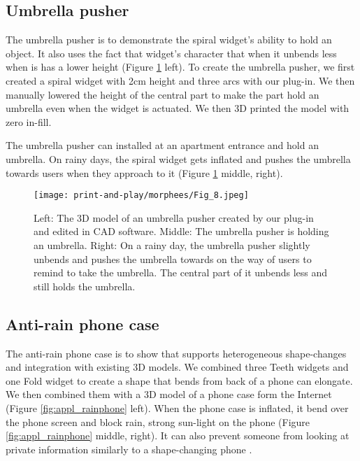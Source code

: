     \subsection{Umbrella pusher}
      The umbrella pusher is to demonstrate the spiral widget's ability to hold
      an object.  It also uses the fact that widget's character that when it
      unbends less when is has a lower height (Figure \ref{fig:appl_umbrella}
      left). To create the umbrella pusher, we first created a spiral widget
      with 2cm height and three arcs with our plug-in. We then manually lowered
      the height of the central part to make the part hold an umbrella even when
      the widget is actuated. We then 3D printed the model with zero in-fill.
    
      The umbrella pusher can installed at an apartment entrance and hold an
      umbrella.  On rainy days, the spiral widget gets inflated and pushes the
      umbrella towards users when they approach to it
      (Figure \ref{fig:appl_umbrella} middle, right).
        
      \begin{figure}[htb]
        \centering
        \texttt{[image: print-and-play/morphees/Fig\_8.jpeg]}
        \caption{Left: The 3D model of an umbrella pusher created by our plug-in
          and edited in CAD software. Middle: The umbrella pusher is holding an
          umbrella. Right: On a rainy day, the umbrella pusher slightly unbends
          and pushes the umbrella towards on the way of users to remind to take
          the umbrella. The central part of it unbends less and still holds the
          umbrella.}
        \label{fig:appl_umbrella}
      \end{figure}
   
    \subsection{Anti-rain phone case}
      The anti-rain phone case is to show that \mp supports heterogeneous
      shape-changes and integration with existing 3D models.  We combined three
      Teeth widgets and one Fold widget to create a shape that bends from back
      of a phone can elongate. We then combined them with a 3D model of a phone
      case form the Internet (Figure \ref{fig:appl_rainphone} left).  When the
      phone case is inflated, it bend over the phone screen and block rain,
      strong sun-light on the phone (Figure \ref{fig:appl_rainphone} middle,
      right). It can also prevent someone from looking at private information
      similarly to a shape-changing phone \cite{Roudaut:2013kz}.
        
